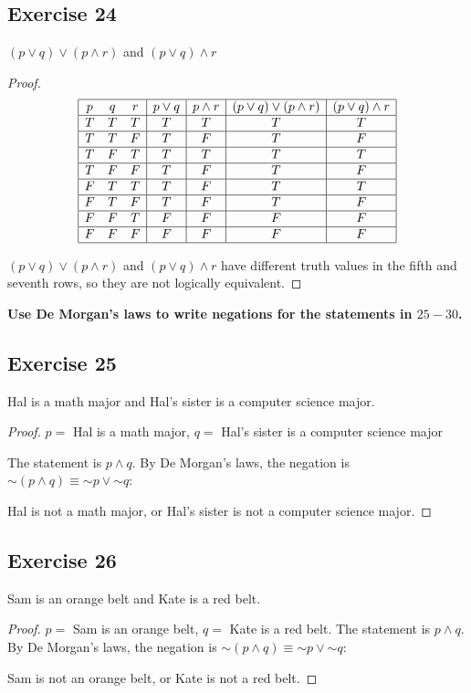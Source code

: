 \documentclass[14pt]{extarticle}
\begin{document}
\subsection{Exercise 24} $(p \vee q) \vee (p \wedge r)$ and $(p \vee q) \wedge
r$

\begin{proof} $$ \begin{array}{|ccc|c|c|c|c|} \hline p & q & r & p \vee q & p
\wedge r & (p \vee q) \vee (p \wedge r) & (p \vee q) \wedge r \\ \hline T & T &
T & T & T & T & T \\ \hline T & T & F & T & F & T & F \\ \hline T & F & T & T &
T & T & T \\ \hline T & F & F & T & F & T & F \\ \hline F & T & T & T & F & T &
T \\ \hline F & T & F & T & F & T & F \\ \hline F & F & T & F & F & F & F \\
\hline F & F & F & F & F & F & F \\ \hline \end{array} $$

$(p \vee q) \vee (p \wedge r)$ and $(p \vee q) \wedge r$ have different truth
values in the fifth and seventh rows, so they are not logically equivalent.
\end{proof}

{\bf Use De Morgan’s laws to write negations for the statements in $25-30$.}

\subsection{Exercise 25} Hal is a math major and Hal’s sister is a computer
science major.

\begin{proof} $p =$ Hal is a math major, $q =$ Hal’s sister is a computer
science major

The statement is $p \wedge q$. By De Morgan's laws, the negation is $\sim(p
\wedge q) \equiv {\sim p} \vee {\sim q}$:

Hal is not a math major, or Hal's sister is not a computer science major.
\end{proof}

\subsection{Exercise 26} Sam is an orange belt and Kate is a red belt.
\begin{proof} $p =$ Sam is an orange belt, $q =$ Kate is a red belt.
The statement is $p \wedge q$. By De Morgan's laws, the negation is $\sim(p
\wedge q) \equiv {\sim p} \vee {\sim q}$:

Sam is not an orange belt, or Kate is not a red belt. \end{proof}
\end{document}
